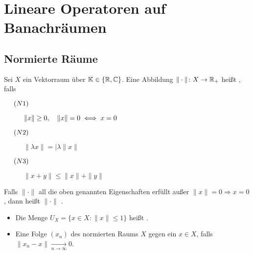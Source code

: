 
\chapter*{Lineare Operatoren auf Banachräumen}  \setcounter{section}{1}



\section{Normierte R{\"a}ume}



\begin{definition}
	Sei $X$ ein Vektorraum über $\mathbb{K} \in\{ \mathbb{R}, \mathbb{C} \}$. Eine Abbildung  $\| \cdot \| \colon X \rightarrow \mathbb{R}_{+}$ hei{\ss}t , falls
		\begin{description}
			\item[$\hspace{0.5cm} (N1) \hspace{0.1cm} $] $\| x \| \geq 0, \quad \| x \| = 0 \iff x = 0 $
			\item[$\hspace{0.5cm} (N2) \hspace{0.1cm} $] $\| \lambda x \| = | \lambda \| x \| $
			\item[$\hspace{0.5cm} (N3) \hspace{0.1cm} $] $\| x + y \| \leq \| x \| + \| y \| $
	\end{description}	
\end{definition}


\begin{bemerkung}
	Falls $ \| \cdot \| $ all die oben genannten Eigenschaften erfüllt au{\ss}er $ \| x \| = 0 \Rightarrow x = 0 $, dann hei{\ss}t $ \| \cdot \| $ .
\end{bemerkung}


\begin{vereinbarungen}
	\begin{itemize}
		\item Die Menge $ U_{X} = \{ x \in X:  \|x \| \leq 1 \}$ hei{\ss}t .
		\item Eine Folge $(x_{n})$ des normierten Raums $X$  gegen ein $ x \in X $, falls  $\| x_{n} - x \| \xrightarrow[n \rightarrow \infty]{} 0$.
	\end{itemize}
\end{vereinbarungen}



